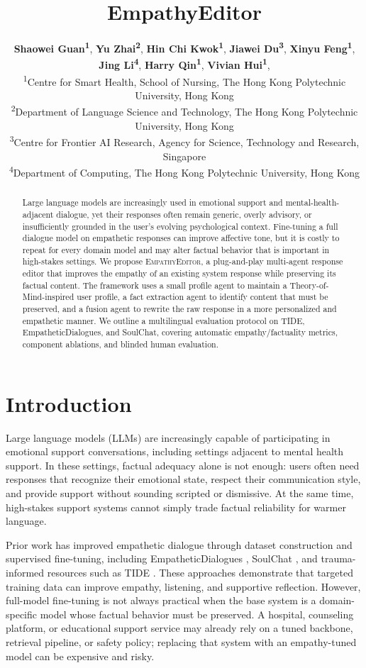 \documentclass[11pt]{article}
\title{EmpathyEditor}
\author{
  \textbf{Shaowei Guan\textsuperscript{1}},
  \textbf{Yu Zhai\textsuperscript{2}},
  \textbf{Hin Chi Kwok\textsuperscript{1}},
  \textbf{Jiawei Du\textsuperscript{3}},
  \textbf{Xinyu Feng\textsuperscript{1}},\\
  \textbf{Jing Li\textsuperscript{4}},
  \textbf{Harry Qin\textsuperscript{1}},
  \textbf{Vivian Hui\textsuperscript{1}},
\\
  \textsuperscript{1}Centre for Smart Health, School of Nursing, The Hong Kong Polytechnic University, Hong Kong \\
  \textsuperscript{2}Department of Language Science and Technology, The Hong Kong Polytechnic University, Hong Kong \\
  \textsuperscript{3}Centre for Frontier AI Research, Agency for Science, Technology and Research, Singapore \\
  \textsuperscript{4}Department of Computing, The Hong Kong Polytechnic University, Hong Kong
}
\begin{document}
\maketitle
\begin{abstract}
Large language models are increasingly used in emotional support and mental-health-adjacent dialogue, yet their responses often remain generic, overly advisory, or insufficiently grounded in the user's evolving psychological context. Fine-tuning a full dialogue model on empathetic responses can improve affective tone, but it is costly to repeat for every domain model and may alter factual behavior that is important in high-stakes settings. We propose \textsc{EmpathyEditor}, a plug-and-play multi-agent response editor that improves the empathy of an existing system response while preserving its factual content. The framework uses a small profile agent to maintain a Theory-of-Mind-inspired user profile, a fact extraction agent to identify content that must be preserved, and a fusion agent to rewrite the raw response in a more personalized and empathetic manner. We outline a multilingual evaluation protocol on TIDE, EmpatheticDialogues, and SoulChat, covering automatic empathy/factuality metrics, component ablations, and blinded human evaluation.
\end{abstract}

\section{Introduction}

Large language models (LLMs) are increasingly capable of participating in emotional support conversations, including settings adjacent to mental health support. In these settings, factual adequacy alone is not enough: users often need responses that recognize their emotional state, respect their communication style, and provide support without sounding scripted or dismissive. At the same time, high-stakes support systems cannot simply trade factual reliability for warmer language.

Prior work has improved empathetic dialogue through dataset construction and supervised fine-tuning, including EmpatheticDialogues \citep{rashkin2019towards}, SoulChat \citep{chen-etal-2023-soulchat}, and trauma-informed resources such as TIDE \citep{bn2025pursuit}. These approaches demonstrate that targeted training data can improve empathy, listening, and supportive reflection. However, full-model fine-tuning is not always practical when the base system is a domain-specific model whose factual behavior must be preserved. A hospital, counseling platform, or educational support service may already rely on a tuned backbone, retrieval pipeline, or safety policy; replacing that system with an empathy-tuned model can be expensive and risky.
\end{document}
